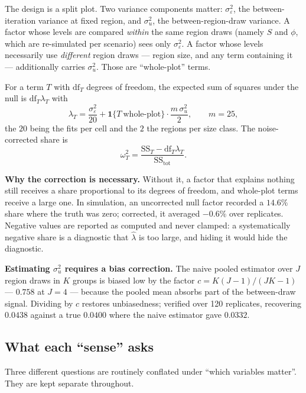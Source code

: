 \documentclass[11pt,a4paper]{article}
\begin{document}
The design is a split plot. Two variance components matter:
$\sigma^2_\varepsilon$, the between-iteration variance at fixed region, and
$\sigma^2_u$, the between-region-draw variance. A factor whose levels are
compared \emph{within} the same region draws (namely $S$ and $\phi$, which are
re-simulated per scenario) sees only $\sigma^2_\varepsilon$. A factor whose
levels necessarily use \emph{different} region draws --- region size, and any
term containing it --- additionally carries $\sigma^2_u$. Those are
``whole-plot'' terms.

For a term $T$ with $\mathrm{df}_T$ degrees of freedom, the expected sum of
squares under the null is $\mathrm{df}_T\lambda_T$ with
\begin{equation}
\lambda_T=\frac{\sigma^2_\varepsilon}{20}
+\mathbf{1}\{T\ \text{whole-plot}\}\cdot\frac{m\,\sigma^2_u}{2},
\qquad m=25 ,
\end{equation}
the $20$ being the fits per cell and the $2$ the regions per size class. The
noise-corrected share is
\begin{equation}
\omega^2_T=\frac{\mathrm{SS}_T-\mathrm{df}_T\lambda_T}{\mathrm{SS}_{\text{tot}}} .
\label{eq:omega}
\end{equation}

\textbf{Why the correction is necessary.} Without it, a factor that explains
nothing still receives a share proportional to its degrees of freedom, and
whole-plot terms receive a large one. In simulation, an uncorrected null factor
recorded a $14.6\%$ share where the truth was zero; corrected, it averaged
$-0.6\%$ over replicates. Negative values are reported as computed and never
clamped: a systematically negative share is a diagnostic that
$\hat\lambda$ is too large, and hiding it would hide the diagnostic.

\textbf{Estimating $\sigma^2_u$ requires a bias correction.} The naive pooled
estimator over $J$ region draws in $K$ groups is biased low by the factor
$c=K(J-1)/(JK-1)$ --- $0.758$ at $J=4$ --- because the pooled mean absorbs part
of the between-draw signal. Dividing by $c$ restores unbiasedness; verified over
120 replicates, recovering $0.0438$ against a true $0.0400$ where the naive
estimator gave $0.0332$.

\subsection{What each ``sense'' asks}\label{sec:senses}

Three different questions are routinely conflated under ``which variables
matter''. They are kept separate throughout.
\end{document}
